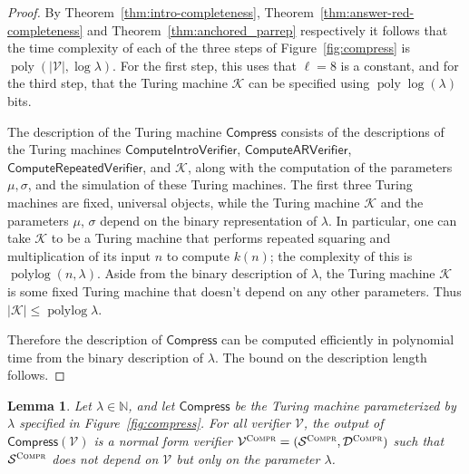 \documentclass[11pt]{article}
\newtheorem{lemma}[theorem]{Lemma}
\theoremstyle{definition}
\newcommand{\N}{\ensuremath{\mathbb{N}}}
\DeclareMathOperator{\poly}{poly}
\DeclareMathOperator{\polylog}{polylog}
\newcommand{\abs}[1]{\left\vert {#1} \right\vert}
\newcommand{\sampler}{\mathcal{S}}
\newcommand{\decider}{\mathcal{D}}
\newcommand{\verifier}{\mathcal{V}}
\newcommand{\compr}{\textsc{Compr}}
\renewcommand{\cal}[1]{\mathcal{#1}}
\newcommand{\tmstyle}[1]{\ensuremath{\mathsf{#1}}}
\newcommand{\Compress}{\tmstyle{Compress}}
\newcommand{\ComputeIntroVerifier}{\tmstyle{ComputeIntroVerifier}}
\newcommand{\ComputeAnsVerifier}{\tmstyle{ComputeARVerifier}}
\newcommand{\ComputeParrepVerifier}{\tmstyle{ComputeRepeatedVerifier}}
\begin{document}
\begin{proof}
  By Theorem~\ref{thm:intro-completeness},
  Theorem~\ref{thm:answer-red-completeness} and
  Theorem~\ref{thm:anchored_parrep} respectively it follows that the time
  complexity of each of the three steps of Figure~\ref{fig:compress} is
  $\poly(\abs{\verifier}, \log \lambda)$.
  For the first step, this uses that $\ell=8$ is a constant, and for the third
  step, that the Turing machine $\cal{K}$ can be specified using
  $\poly\log(\lambda)$ bits.

  The description of the Turing machine $\Compress$ consists of the descriptions
  of the Turing machines $\ComputeIntroVerifier$, $\ComputeAnsVerifier$,
  $\ComputeParrepVerifier$, and $\cal{K}$, along with the computation of the
  parameters $\mu,\sigma$, and the simulation of these Turing machines.
  The first three Turing machines are fixed, universal objects, while the Turing
  machine $\cal{K}$ and the parameters $\mu$, $\sigma$ depend on the binary
  representation of $\lambda$.
  In particular, one can take $\cal{K}$ to be a Turing machine that performs
  repeated squaring and multiplication of its input $n$ to compute $k(n)$; the
  complexity of this is $\polylog(n,\lambda)$.
  Aside from the binary description of $\lambda$, the Turing machine $\cal{K}$
  is some fixed Turing machine that doesn't depend on any other parameters.
  Thus $|\cal{K}| \leq \polylog \lambda$.
	
  Therefore the description of $\Compress$ can be computed efficiently in
  polynomial time from the binary description of $\lambda$.
  The bound on the description length follows.
\end{proof}

\begin{lemma}
  \label{lem:compress-independent-samplers}
  Let $\lambda\in \N$, and let $\Compress$ be the Turing machine parameterized
  by $\lambda$ specified in Figure~\ref{fig:compress}.
  For all verifier $\verifier$, the output of $\Compress(\verifier)$ is a normal
  form verifier $\verifier^\compr = (\sampler^\compr, \decider^\compr)$ such
  that $\sampler^\compr$ does not depend on $\verifier$ but only on the
  parameter $\lambda$.
\end{lemma}
\end{document}
